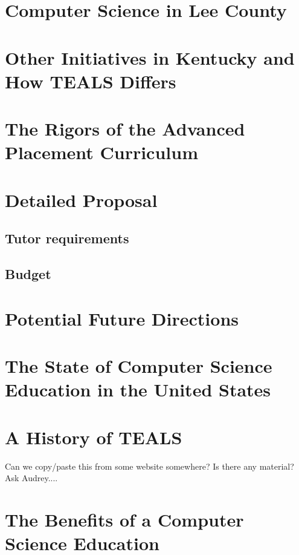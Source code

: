 \documentclass[11pt]{article}
\begin{document}


%
%
%
%
%
%
%
%
%




\section{Computer Science in Lee County}\label{sec:CSInLee}

\section{Other Initiatives in Kentucky and How TEALS Differs}\label{sec:diffs}

\section{The Rigors of the Advanced Placement Curriculum}\label{sec:ap}

\section{Detailed Proposal}\label{sec:proposal}

\subsection{Tutor requirements}\label{ssec:tutor}

\subsection{Budget}\label{ssec:budget}

\section{Potential Future Directions}\label{sec:future}

\appendix

\section{The State of Computer Science Education in the United States}\label{sec:CSInUSA}

\section{A History of TEALS}\label{sec:TEALS}

Can we copy/paste this from some website somewhere? Is there any material? Ask Audrey....

\section{The Benefits of a Computer Science Education}\label{sec:benefits}



\end{document}
